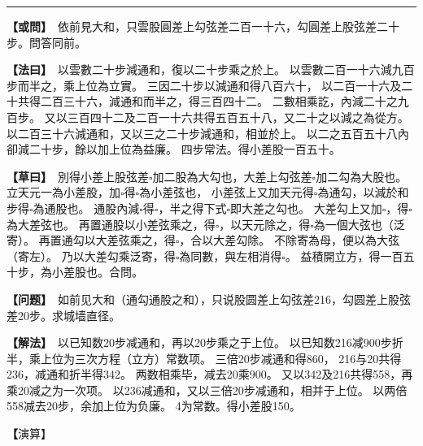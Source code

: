 \documentclass[11pt,a4paper]{article}
\let\origsquare\square
\renewcommand{\square}{\ensuremath{\origsquare}}%
\newcommand{\longline}{\noindent\rule{\textwidth}{0.4pt}}
\newcommand{\clOWEN}[1]{%
  \par\vspace{0.3em}%
  \noindent\textcolor{problemcolor}{\textbf{【或問】}}\,{\tradfont #1}\par\nopagebreak%
}
\newcommand{\mdOWEN}[1]{%
  \par\vspace{0.3em}%
  \noindent\textcolor{problemcolor}{\textbf{【问题】}}\,{\modfont #1}\par\nopagebreak%
}
\newcommand{\clFAYUE}[1]{%
  \par\noindent\textcolor{methodcolor}{\textbf{【法曰】}}\,{\tradfont #1}\par\nopagebreak%
}
\newcommand{\mdFAYUE}[1]{%
  \par\noindent\textcolor{methodcolor}{\textbf{【解法】}}\,{\modfont #1}\par\nopagebreak%
}
\newcommand{\clTSAOYUE}[1]{%
  \par\noindent\textcolor{workcolor}{\textbf{【草曰】}}\,{\tradfont #1}\par%
}
\newcommand{\mdTSAOYUE}[1]{%
  \par\noindent\textcolor{workcolor}{\textbf【演算】}}\,{\modfont #1}\par%
\begin{document}
\vspace{0.3cm}
\begin{center}\longline\end{center}

\begin{paracol}{2}

\begin{leftcolumn}
\clOWEN{%
依前見大和，只雲股圓差上勾弦差二百一十六，勾圓差上股弦差二十步。問答同前。}

\clFAYUE{%
以雲數二十步減通和，復以二十步乘之於上。
以雲數二百一十六減九百步而半之，乘上位為立實。
三因二十步以減通和得八百六十，
以二百一十六及二十共得二百三十六，減通和而半之，得三百四十二。
二數相乘訖，內減二十之九百步。
又以三百四十二及二百一十六共得五百五十八，又二十之以減之為從方。
以二百三十六減通和，又以三之二十步減通和，相並於上。
以二之五百五十八內卻減二十步，餘以加上位為益廉。
四步常法。得小差股一百五十。}

\clTSAOYUE{%
別得小差上股弦差$\square$加二股為大勾也，大差上勾弦差$\square$加二勾為大股也。
立天元一為小差股，加$\square$得$\square$為小差弦也，
小差弦上又加天元得$\square$為通勾，以減於和步得$\square$為通股也。
通股內減$\square$得$\square$，半之得下式$\square$即大差之勾也。
大差勾上又加$\square$，得$\square$為大差弦也。
再置通股以小差弦乘之，得$\square$，以天元除之，得$\square$為一個大弦也（泛寄）。
再置通勾以大差弦乘之，得$\square$，合以大差勾除。
不除寄為母，便以為大弦（寄左）。
乃以大差勾乘泛寄，得$\square$為同數，與左相消得$\square$。
益積開立方，得一百五十步，為小差股也。合問。}
\end{leftcolumn}

\switchcolumn

\begin{rightcolumn}
\mdOWEN{%
如前见大和（通勾通股之和），只说股圆差上勾弦差216，勾圆差上股弦差20步。求城墙直径。}

\mdFAYUE{%
以已知数20步减通和，再以20步乘之于上位。
以已知数216减900步折半，乘上位为三次方程（立方）常数项。
三倍20步减通和得860，
216与20共得236，减通和折半得342。
两数相乘毕，减去20乘900。
又以342及216共得558，再乘20减之为一次项。
以236减通和，又以三倍20步减通和，相并于上位。
以两倍558减去20步，余加上位为负廉。
4为常数。得小差股150。}

\mdTSAOYUE{%
辨识得：小差上股弦差$\square$加两倍股为大勾，大差上勾弦差$\square$加两倍勾为大股。
设天元一为小差股，加$\square$得$\square$为小差弦，
小差弦上又加天元得$\square$为通勾，从和步中减去得$\square$为通股。
通股内减$\square$得$\square$，折半得下式$\square$即大差之勾。
大差勾上加$\square$得$\square$为大差弦。
再取通股以小差弦乘之得$\square$，除以天元得$\square$为一个大弦（泛寄）。
再取通勾以大差弦乘之得$\square$，应以大差勾除。
不除寄为分母，便以为大弦（寄左）。
以大差勾乘泛寄得$\square$为同数，与左式相消得$\square$。
益积开立方得150步，即为小差股。符合所问。}
\end{rightcolumn}

\end{paracol}
\end{document}
